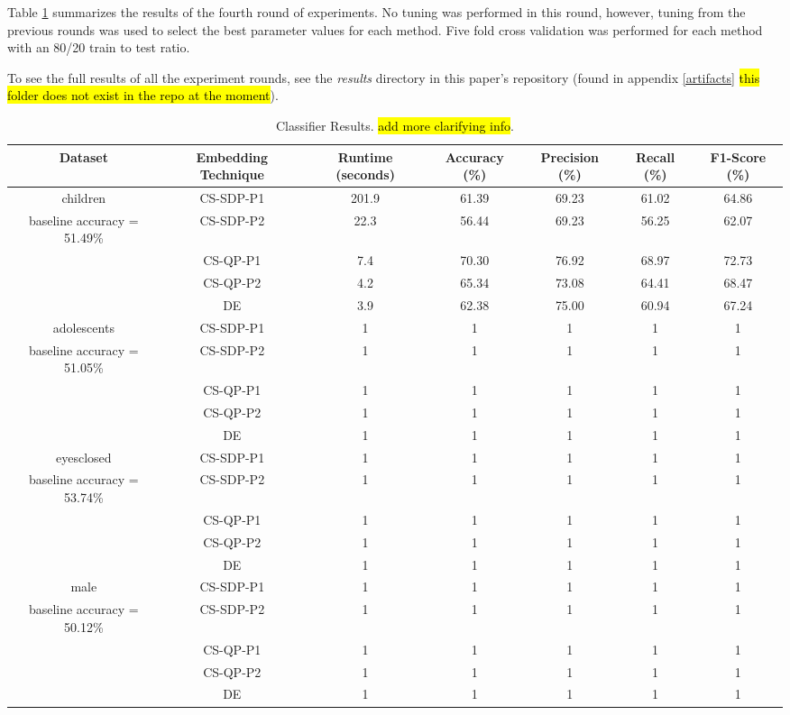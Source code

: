 \documentclass[sigconf]{acmart}
\begin{document}
Table \ref{tab:results} summarizes the results of the fourth round of experiments.
No tuning was performed in this round, however, tuning from the previous rounds was used to select the best parameter values for each method.
Five fold cross validation was performed for each method with an 80/20 train to test ratio.

To see the full results of all the experiment rounds, see the \emph{results} directory in this paper's repository (found in appendix \ref{artifacts} \hl{this folder does not exist in the repo at the moment}).

\begin{table}[t]
    \centering
    \caption{Classifier Results. \hl{add more clarifying info}.}
    \begin{tabular}{c c c c c c c}
        \hline
        Dataset & Embedding Technique & Runtime (seconds) & Accuracy (\%) & Precision (\%) & Recall (\%) & F1-Score (\%)\\
        \hline
        children & CS-SDP-P1 & 201.9 & 61.39 & 69.23 & 61.02 & 64.86 \\
        baseline accuracy = 51.49\% & CS-SDP-P2 & 22.3 & 56.44 & 69.23 & 56.25 & 62.07 \\
        & CS-QP-P1 & 7.4 & 70.30 & 76.92 & 68.97 & 72.73 \\
        & CS-QP-P2 & 4.2 & 65.34 & 73.08 & 64.41 & 68.47 \\
        & DE & 3.9 & 62.38 & 75.00 & 60.94 & 67.24 \\
        \hline
        adolescents & CS-SDP-P1 & 1 & 1 & 1 & 1 & 1 \\
        baseline accuracy = 51.05\% & CS-SDP-P2 & 1 & 1 & 1 & 1 & 1 \\
        & CS-QP-P1 & 1 & 1 & 1 & 1 & 1 \\
        & CS-QP-P2 & 1 & 1 & 1 & 1 & 1 \\
        & DE & 1 & 1 & 1 & 1 & 1 \\
        \hline
        eyesclosed & CS-SDP-P1 & 1 & 1 & 1 & 1 & 1 \\
        baseline accuracy = 53.74\% & CS-SDP-P2 & 1 & 1 & 1 & 1 & 1 \\
        & CS-QP-P1 & 1 & 1 & 1 & 1 & 1 \\
        & CS-QP-P2 & 1 & 1 & 1 & 1 & 1 \\
        & DE & 1 & 1 & 1 & 1 & 1 \\
        \hline
        male & CS-SDP-P1 & 1 & 1 & 1 & 1 & 1 \\
        baseline accuracy = 50.12\% & CS-SDP-P2 & 1 & 1 & 1 & 1 & 1 \\
        & CS-QP-P1 & 1 & 1 & 1 & 1 & 1 \\
        & CS-QP-P2 & 1 & 1 & 1 & 1 & 1 \\
        & DE & 1 & 1 & 1 & 1 & 1 \\
        \hline
    \end{tabular}
    \label{tab:results}
\end{table}
\end{document}
